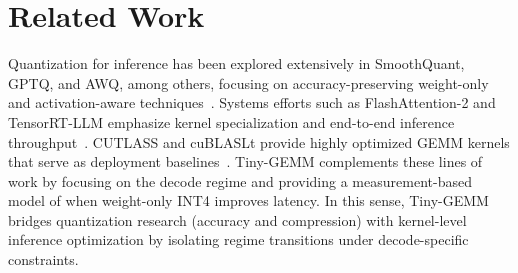 \section{Related Work}
Quantization for inference has been explored extensively in SmoothQuant,
GPTQ, and AWQ, among others, focusing on accuracy-preserving weight-only and
activation-aware techniques~\cite{smoothquant,gptq,awq}. Systems efforts such as
FlashAttention-2 and TensorRT-LLM emphasize kernel specialization and end-to-end
inference throughput~\cite{flashattention2,tensorrtllm}. CUTLASS and cuBLASLt
provide highly optimized GEMM kernels that serve as deployment
baselines~\cite{cutlass,cublaslt}. Tiny-GEMM complements these lines of work by
focusing on the decode regime and providing a measurement-based model of when
weight-only INT4 improves latency. In this sense, Tiny-GEMM bridges quantization
research (accuracy and compression) with kernel-level inference optimization by
isolating regime transitions under decode-specific constraints.
